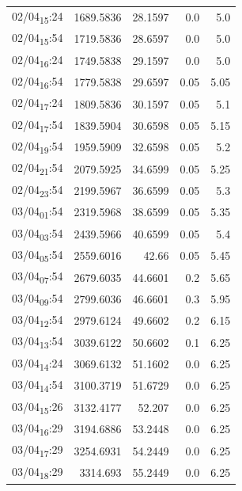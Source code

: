 \documentclass[11pt]{article}
\begin{document}
\begin{center}
\begin{tabular}{lrrrr}
02/04\textsubscript{15}:24 & 1689.5836 & 28.1597 & 0.0 & 5.0\\[0pt]
02/04\textsubscript{15}:54 & 1719.5836 & 28.6597 & 0.0 & 5.0\\[0pt]
02/04\textsubscript{16}:24 & 1749.5838 & 29.1597 & 0.0 & 5.0\\[0pt]
02/04\textsubscript{16}:54 & 1779.5838 & 29.6597 & 0.05 & 5.05\\[0pt]
02/04\textsubscript{17}:24 & 1809.5836 & 30.1597 & 0.05 & 5.1\\[0pt]
02/04\textsubscript{17}:54 & 1839.5904 & 30.6598 & 0.05 & 5.15\\[0pt]
02/04\textsubscript{19}:54 & 1959.5909 & 32.6598 & 0.05 & 5.2\\[0pt]
02/04\textsubscript{21}:54 & 2079.5925 & 34.6599 & 0.05 & 5.25\\[0pt]
02/04\textsubscript{23}:54 & 2199.5967 & 36.6599 & 0.05 & 5.3\\[0pt]
03/04\textsubscript{01}:54 & 2319.5968 & 38.6599 & 0.05 & 5.35\\[0pt]
03/04\textsubscript{03}:54 & 2439.5966 & 40.6599 & 0.05 & 5.4\\[0pt]
03/04\textsubscript{05}:54 & 2559.6016 & 42.66 & 0.05 & 5.45\\[0pt]
03/04\textsubscript{07}:54 & 2679.6035 & 44.6601 & 0.2 & 5.65\\[0pt]
03/04\textsubscript{09}:54 & 2799.6036 & 46.6601 & 0.3 & 5.95\\[0pt]
03/04\textsubscript{12}:54 & 2979.6124 & 49.6602 & 0.2 & 6.15\\[0pt]
03/04\textsubscript{13}:54 & 3039.6122 & 50.6602 & 0.1 & 6.25\\[0pt]
03/04\textsubscript{14}:24 & 3069.6132 & 51.1602 & 0.0 & 6.25\\[0pt]
03/04\textsubscript{14}:54 & 3100.3719 & 51.6729 & 0.0 & 6.25\\[0pt]
03/04\textsubscript{15}:26 & 3132.4177 & 52.207 & 0.0 & 6.25\\[0pt]
03/04\textsubscript{16}:29 & 3194.6886 & 53.2448 & 0.0 & 6.25\\[0pt]
03/04\textsubscript{17}:29 & 3254.6931 & 54.2449 & 0.0 & 6.25\\[0pt]
03/04\textsubscript{18}:29 & 3314.693 & 55.2449 & 0.0 & 6.25\\[0pt]
\end{tabular}
\end{center}
\end{document}
